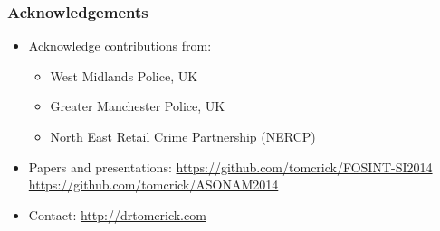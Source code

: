 \documentclass[pdftex]{beamer}
\begin{document}
\begin{frame}
\frametitle{Acknowledgements}
\begin{itemize}
\item Acknowledge contributions from:
\begin{itemize}
\item West Midlands Police, UK
\item Greater Manchester Police, UK
\item North East Retail Crime Partnership (NERCP)\newline
\end{itemize}
\item Papers and presentations:
  \url{https://github.com/tomcrick/FOSINT-SI2014}\\
\url{https://github.com/tomcrick/ASONAM2014}\newline
\item Contact: \url{http://drtomcrick.com}

\end{itemize}
\end{frame}
\end{document}
